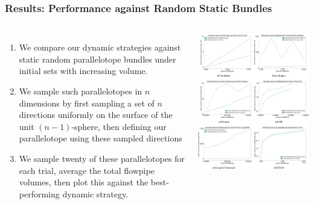 \documentclass{beamer}
\begin{document}
\begin{frame}
  \frametitle{\textbf{Results:}  Performance against Random Static Bundles}
  \begin{columns}
      \footnotesize
        \begin{enumerate}
          \item We compare our dynamic strategies against static random parallelotope bundles under initial sets with increasing volume.
          \item We sample such parallelotopes in $n$ dimensions by first sampling a set of $n$ directions uniformly on the surface of the unit $(n-1)$-sphere, then defining our parallelotope using these sampled directions
          \item We sample twenty of these parallelotopes for each trial, average the total flowpipe volumes, then plot this against the best-performing dynamic strategy.
        \end{enumerate}

      \includegraphics[width=1.1\textwidth]{randomvolplot}
  \end{columns}
\end{frame}
\end{document}
